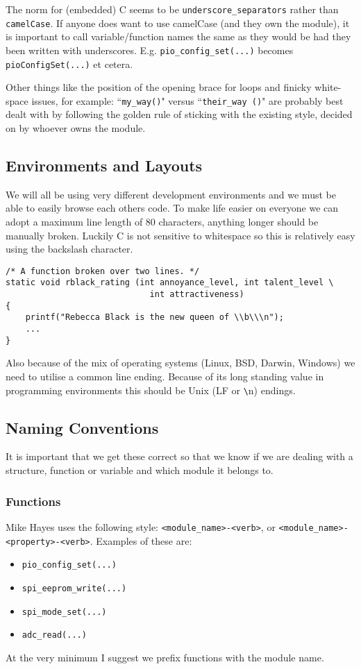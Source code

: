 \documentclass[10pt]{article}
\begin{document}
The norm for (embedded) C seems to be \texttt{underscore\_separators} rather than \texttt{camelCase}. If anyone does want to use camelCase (and they own the module), it is important to call variable/function names the same as they would be had they been written with underscores. E.g. \texttt{pio\_config\_set(...)} becomes \texttt{pioConfigSet(...)} et cetera.

Other things like the position of the opening brace for loops and finicky white-space issues, for example: ``\texttt{my\_way()}" versus ``\texttt{their\_way ()}" are probably best dealt with by following the golden rule of sticking with the existing style, decided on by whoever owns the module.

\subsection{Environments and Layouts}
We will all be using very different development environments and we must be able to easily browse each others code. To make life easier on everyone we can adopt a maximum line length of 80 characters, anything longer should be manually broken. Luckily C is not sensitive to whitespace so this is relatively easy using the backslash character.

\begin{lstlisting}[frame=single,showstringspaces=false]
/* A function broken over two lines. */
static void rblack_rating (int annoyance_level, int talent_level \
                             int attractiveness)
{
    printf("Rebecca Black is the new queen of \\b\\\n");
    ...
}
\end{lstlisting}

Also because of the mix of operating systems (Linux, BSD, Darwin, Windows) we
need to utilise a common line ending.  Because of its long standing value in
programming environments this should be Unix (LF or {\texttt\textbackslash n})
endings.

\subsection{Naming Conventions}
It is important that we get these correct so that we know if we are dealing with a structure, function or variable and which module it belongs to.
\subsubsection{Functions}
Mike Hayes uses the following style: \texttt{<module\_name>-<verb>}, or \texttt{<module\_name>-<property>-<verb>}. Examples of these are:
\begin{itemize}
  \item \texttt{pio\_config\_set(...)}
  \item \texttt{spi\_eeprom\_write(...)}
  \item \texttt{spi\_mode\_set(...)}
  \item \texttt{adc\_read(...)}
\end{itemize}
At the very minimum I suggest we prefix functions with the module name.
\end{document}

